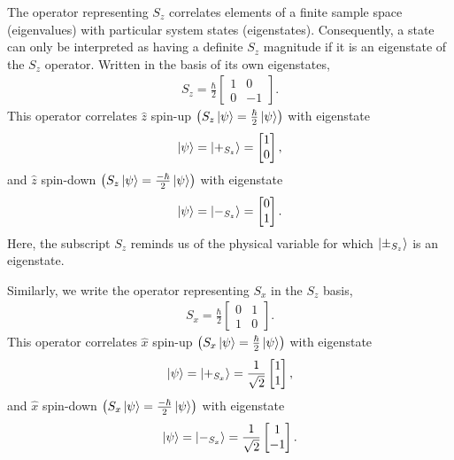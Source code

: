 The operator representing $S_z$ correlates elements of a finite sample space (eigenvalues) with particular system states (eigenstates). Consequently, a state can only be interpreted as having a definite $S_z$ magnitude if it is an eigenstate of the $S_z$ operator. Written in the basis of its own eigenstates,
\begin{align}
    S_z = \frac{\hbar}{2}\begin{bmatrix} 1 & 0 \\ 0 & -1 \end{bmatrix}.
\end{align}
This operator correlates $\hat{z}$ spin-up $\left(S_z \ket{\psi} = \frac{\hbar}{2}\ket{\psi}\right)$ with eigenstate
\begin{align} \label{eq:z up state}
    \ket{\psi} = \ket{+_{S_z}} = \begin{bmatrix} 1 \\ 0 \end{bmatrix},
\end{align}
and $\hat{z}$ spin-down $\left(S_z \ket{\psi} = \frac{-\hbar}{2}\ket{\psi}\right)$ with eigenstate
\begin{align}
    \ket{\psi} = \ket{-_{S_z}} = \begin{bmatrix} 0 \\ 1 \end{bmatrix}.
\end{align}
Here, the subscript $S_z$ reminds us of the physical variable for which $\ket{\pm_{S_z}}$ is an eigenstate.

Similarly, we write the operator representing $S_x$ in the $S_z$ basis,
\begin{align}
    S_x = \frac{\hbar}{2}\begin{bmatrix} 0 & 1 \\ 1 & 0 \end{bmatrix}.
\end{align}
This operator correlates $\hat{x}$ spin-up $\left(S_x \ket{\psi} = \frac{\hbar}{2} \ket{\psi}\right)$ with eigenstate
\begin{align} \label{eq:x up state}
    \ket{\psi} = \ket{+_{S_x}} = \frac{1}{\sqrt{2}}\begin{bmatrix} 1 \\ 1 \end{bmatrix},
\end{align}
and $\hat{x}$ spin-down $\left(S_x \ket{\psi} = \frac{-\hbar}{2} \ket{\psi}\right)$ with eigenstate
\begin{align} \label{eq:x down state}
    \ket{\psi} = \ket{-_{S_x}} = \frac{1}{\sqrt{2}}\begin{bmatrix} 1 \\ -1 \end{bmatrix}.
\end{align}

